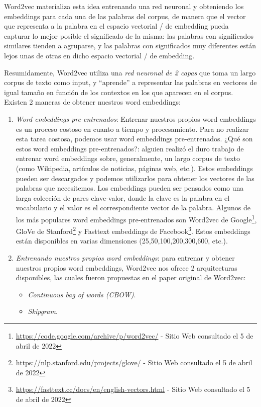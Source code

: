 \documentclass[12pt,a4paper]{article}
\begin{document}
\begin{sloppypar}
Word2vec materializa esta idea entrenando una red neuronal y obteniendo los embeddings para cada una de las palabras del corpus, de manera que el vector que representa a la palabra en el espacio vectorial / de embedding pueda capturar lo mejor posible el significado de la misma: las palabras con significados similares tienden a agruparse, y las palabras con significados muy diferentes están lejos unas de otras en dicho espacio vectorial / de embedding.

Resumidamente, Word2vec utiliza una \textit{red neuronal de 2 capas} que toma un largo corpus de texto como input, y “aprende” a representar las palabras en vectores de igual tamaño en función de los contextos en los que aparecen en el corpus. 
\\

Existen 2 maneras de obtener nuestros word embeddings\cite{NLP_26}: 
\begin{enumerate}

\item \textit{Word embeddings pre-entrenados}: Entrenar nuestros propios word embeddings es un proceso costoso en cuanto a tiempo y procesamiento. Para no realizar esta tarea costosa, podemos usar word embeddings pre-entrenados. ¿Qué son estos word embeddings pre-entrenados?: alguien realizó el duro trabajo de entrenar word embeddings sobre, generalmente, un largo corpus de texto (como Wikipedia, artículos de noticias, páginas web, etc.). Estos embeddings pueden ser descargados y podemos utilizarlos para obtener los vectores de las palabras que necesitemos. Los embeddings pueden ser pensados como una larga colección de pares clave-valor, donde la clave es la palabra en el vocabulario y el valor es el correspondiente vector de la palabra. Algunos de los más populares word embeddings pre-entrenados son Word2vec de Google\footnote{\url{https://code.google.com/archive/p/word2vec/} - Sitio Web consultado el 5 de abril de 2022}, GloVe de Stanford\footnote{\url{https://nlp.stanford.edu/projects/glove/} - Sitio Web consultado el 5 de abril de 2022} y Fasttext embeddings de Facebook\footnote{\url{https://fasttext.cc/docs/en/english-vectors.html} - Sitio Web consultado el 5 de abril de 2022}. Estos embeddings están disponibles en varias dimensiones (25,50,100,200,300,600, etc.).

\cleardoublepage

\item \textit{Entrenando nuestros propios word embeddings}: para entrenar y obtener nuestros propios word embeddings, Word2vec nos ofrece 2 arquitecturas disponibles, las cuales fueron propuestas en el paper original de Word2vec\cite{NLP_11}:
\begin{itemize}
\item \textit{Continuous bag of words (CBOW)}.
\item \textit{Skipgram}.
\end{itemize}


\end{enumerate}
\end{sloppypar}
\end{document}
